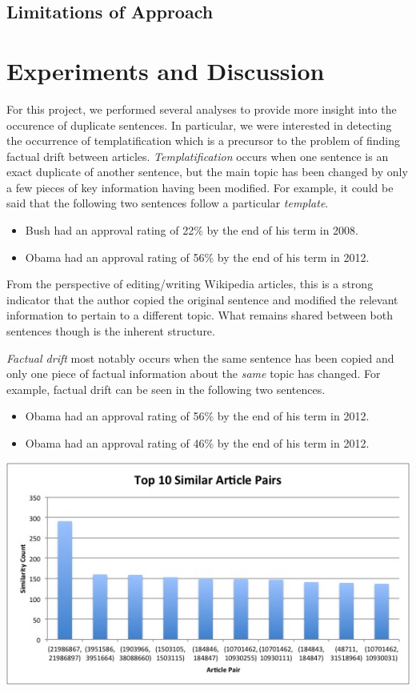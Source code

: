 \documentclass{acm_proc_article-sp}
\begin{document}
\subsection{Limitations of Approach}

\section{Experiments and Discussion}
For this project, we performed several analyses to provide more insight into the occurence of duplicate sentences. In particular, we were interested in detecting the occurrence of templatification which is a precursor to the problem of finding factual drift between articles. \emph{Templatification} occurs when one sentence is an exact duplicate of another sentence, but the main topic has been changed by only a few pieces of key information having been modified. For example, it could be said that the following two sentences follow a particular \emph{template}.
\begin{itemize}[noitemsep,nolistsep]
\item Bush had an approval rating of 22\% by the end of his term in 2008.
\item Obama had an approval rating of 56\% by the end of his term in 2012.
\end{itemize}
From the perspective of editing/writing Wikipedia articles, this is a strong indicator that the author copied the original sentence and modified the relevant information to pertain to a different topic. What remains shared between both sentences though is the inherent structure.

\emph{Factual drift} most notably occurs when the same sentence has been copied and only one piece of factual information about the \emph{same} topic has changed. For example, factual drift can be seen in the following two sentences.
\begin{itemize}[noitemsep,nolistsep]
\item Obama had an approval rating of 56\% by the end of his term in 2012.
\item Obama had an approval rating of 46\% by the end of his term in 2012.
\end{itemize}

\begin{center}
\includegraphics[scale=0.43, keepaspectratio = true]{Top10ArticlePairs.jpg}
\end{center}
\end{document}
